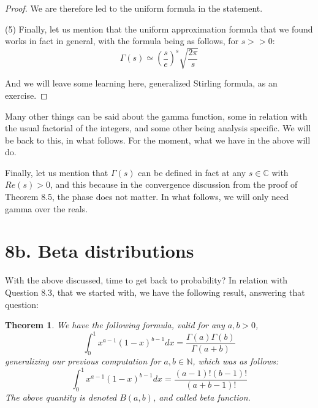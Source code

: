 \documentclass[12pt]{amsbook}
\newtheorem{theorem}{Theorem}[chapter]
\begin{document}
\begin{proof}
We are therefore led to the uniform formula in the statement.

\medskip

(5) Finally, let us mention that the uniform approximation formula that we found works in fact in general, with the formula being as follows, for $s>>0$:
$$\Gamma(s)\simeq \left(\frac{s}{e}\right)^s\sqrt{\frac{2\pi}{s}}$$

And we will leave some learning here, generalized Stirling formula, as an exercise.
\end{proof}

Many other things can be said about the gamma function, some in relation with the usual factorial of the integers, and some other being analysis specific. We will be back to this, in what follows. For the moment, what we have in the above will do.

\bigskip

Finally, let us mention that $\Gamma(s)$ can be defined in fact at any $s\in\mathbb C$ with $Re(s)>0$, and this because in the convergence discussion from the proof of Theorem 8.5, the phase does not matter. In what follows, we will only need gamma over the reals.

\section*{8b. Beta distributions}

With the above discussed, time to get back to probability? In relation with Question 8.3, that we started with, we have the following result, answering that question:

\begin{theorem}
We have the following formula, valid for any $a,b>0$,
$$\int_0^1x^{a-1}(1-x)^{b-1}dx=\frac{\Gamma(a)\Gamma(b)}{\Gamma(a+b)}$$
generalizing our previous computation for $a,b\in\mathbb N$, which was as follows:
$$\int_0^1x^{a-1}(1-x)^{b-1}dx=\frac{(a-1)!(b-1)!}{(a+b-1)!}$$
The above quantity is denoted $B(a,b)$, and called beta function. 
\end{theorem}
\end{document}
